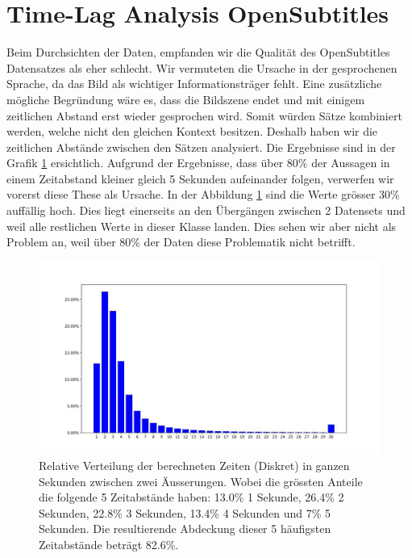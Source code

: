 \section{Time-Lag Analysis OpenSubtitles}
\label{data:opensubtitles:time_lag_analysis}
Beim Durchsichten der Daten, empfanden wir die Qualität des OpenSubtitles Datensatzes als eher schlecht. Wir vermuteten die Ursache in der gesprochenen Sprache, da das Bild als wichtiger Informationsträger fehlt. Eine zusätzliche mögliche Begründung wäre es, dass die Bildszene endet und mit einigem zeitlichen Abstand erst wieder gesprochen wird. Somit würden Sätze kombiniert werden, welche nicht den gleichen Kontext besitzen. Deshalb haben wir die zeitlichen Abstände zwischen den Sätzen analysiert. Die Ergebnisse sind in der Grafik \ref{fig:data:analyse:timediff:opus} ersichtlich. Aufgrund der Ergebnisse, dass über 80\% der Aussagen in einem Zeitabstand kleiner gleich 5 Sekunden aufeinander folgen, verwerfen wir vorerst diese These als Ursache. In der Abbildung \ref{fig:data:analyse:timediff:opus} sind die Werte grösser 30\% auffällig hoch. Dies liegt einerseits an den Übergängen zwischen 2 Datensets und weil alle restlichen Werte in dieser Klasse landen. Dies sehen wir aber nicht als Problem an, weil über 80\% der Daten diese Problematik nicht betrifft.
\begin{figure}[h]
	\centering
	\includegraphics[width=15cm]{img/opus_time_analyze.PNG}
	\caption{Relative Verteilung der berechneten Zeiten (Diskret) in ganzen Sekunden zwischen zwei Äusserungen. Wobei die grössten Anteile die folgende 5 Zeitabstände haben: 13.0\% 1 Sekunde, 26.4\% 2 Sekunden, 22.8\% 3 Sekunden, 13.4\% 4 Sekunden und 7\% 5 Sekunden. Die resultierende Abdeckung dieser 5 häufigsten Zeitabstände beträgt 82.6\%.}
	\label{fig:data:analyse:timediff:opus}
\end{figure}

